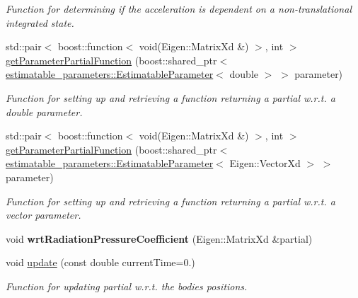 \begin{DoxyCompactItemize}
\begin{DoxyCompactList}\small\item\em Function for determining if the acceleration is dependent on a non-\/translational integrated state. \end{DoxyCompactList}\item 
std\+::pair$<$ boost\+::function$<$ void(Eigen\+::\+Matrix\+Xd \&) $>$, int $>$ \hyperlink{classtudat_1_1acceleration__partials_1_1CannonBallRadiationPressurePartial_af98f948ef60241826e27489cf31d05f4}{get\+Parameter\+Partial\+Function} (boost\+::shared\+\_\+ptr$<$ \hyperlink{classtudat_1_1estimatable__parameters_1_1EstimatableParameter}{estimatable\+\_\+parameters\+::\+Estimatable\+Parameter}$<$ double $>$ $>$ parameter)
\begin{DoxyCompactList}\small\item\em Function for setting up and retrieving a function returning a partial w.\+r.\+t. a double parameter. \end{DoxyCompactList}\item 
std\+::pair$<$ boost\+::function$<$ void(Eigen\+::\+Matrix\+Xd \&) $>$, int $>$ \hyperlink{classtudat_1_1acceleration__partials_1_1CannonBallRadiationPressurePartial_afc1fd975481defde6acc5d10f9c38922}{get\+Parameter\+Partial\+Function} (boost\+::shared\+\_\+ptr$<$ \hyperlink{classtudat_1_1estimatable__parameters_1_1EstimatableParameter}{estimatable\+\_\+parameters\+::\+Estimatable\+Parameter}$<$ Eigen\+::\+Vector\+Xd $>$ $>$ parameter)
\begin{DoxyCompactList}\small\item\em Function for setting up and retrieving a function returning a partial w.\+r.\+t. a vector parameter. \end{DoxyCompactList}\item 
void {\bfseries wrt\+Radiation\+Pressure\+Coefficient} (Eigen\+::\+Matrix\+Xd \&partial)\hypertarget{classtudat_1_1acceleration__partials_1_1CannonBallRadiationPressurePartial_afe5f40aa8a37b0b7498d703a4a3355c2}{}\label{classtudat_1_1acceleration__partials_1_1CannonBallRadiationPressurePartial_afe5f40aa8a37b0b7498d703a4a3355c2}

\item 
void \hyperlink{classtudat_1_1acceleration__partials_1_1CannonBallRadiationPressurePartial_ac146f0ef1adda30ba9657bac6e563692}{update} (const double current\+Time=0.)
\begin{DoxyCompactList}\small\item\em Function for updating partial w.\+r.\+t. the bodies\textquotesingle{} positions. \end{DoxyCompactList}\end{DoxyCompactItemize}

